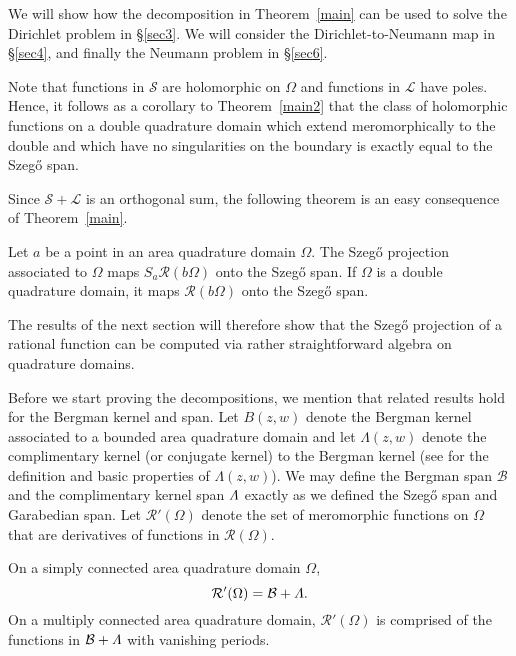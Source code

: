 \documentclass[12pt]{amsart}
\newcommand\Om{\Omega}
\numberwithin{equation}{section}
\begin{document}
We will show how the decomposition in Theorem~\ref{main}
can be used to solve the Dirichlet problem in \S\ref{sec3}.
We will consider the Dirichlet-to-Neumann map in
\S\ref{sec4}, and finally the Neumann problem in
\S\ref{sec6}.

Note that functions in $\mathcal S$ are holomorphic
on $\Om$ and functions in $\mathcal L$ have poles.
Hence, it follows as a corollary to Theorem~\ref{main2}
that the class of holomorphic functions on a double
quadrature domain which extend meromorphically to the
double and which have no singularities on the boundary
is exactly equal to the Szeg\H o span.

Since $\mathcal S + \mathcal L$ is an orthogonal sum,
the following theorem is an easy consequence of
Theorem~\ref{main}.

\begin{thm}
\label{szegoproj}
Let $a$ be a point in an area quadrature domain $\Om$.
The Szeg\H o projection associated to $\Om$ maps
$S_a{\mathcal R}(b\Om)$ onto the Szeg\H o span. If
$\Om$ is a double quadrature domain, it maps
${\mathcal R}(b\Om)$ onto the Szeg\H o span.
\end{thm}

The results of the next section will therefore show
that the Szeg\H o projection of a rational function
can be computed via rather straightforward algebra on
quadrature domains.

Before we start proving the decompositions, we
mention that related results hold
for the Bergman kernel and span. Let $B(z,w)$ denote
the Bergman kernel associated to a bounded area
quadrature domain and let $\Lambda(z,w)$ denote the
complimentary kernel (or conjugate kernel) to the
Bergman kernel (see \cite[p.~134]{B1} for the
definition and basic properties of $\Lambda(z,w)$).
We may define the Bergman span $\mathcal B$ and the
complimentary kernel span $\mathnormal{\Lambda}$
exactly as we defined the Szeg\H o span and
Garabedian span. Let ${\mathcal R}'(\Om)$ denote
the set of meromorphic functions on $\Om$ that are
derivatives of functions in ${\mathcal R}(\Om)$.

\begin{thm}
\label{bergman}
On a simply connected area quadrature domain $\Om$, 
$${\mathcal R}'(\Om)=\mathcal B+\mathnormal{\Lambda}.$$
On a multiply connected area quadrature domain,
${\mathcal R}'(\Om)$ is comprised of the functions
in $\mathcal B+\mathnormal{\Lambda}$ with vanishing periods.
\end{thm}
\end{document}
